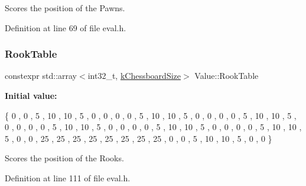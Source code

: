 Scores the position of the Pawns. 



Definition at line 69 of file eval.\+h.

\mbox{\label{namespaceValue_ae8066836a21ce4367ff232f08ce796a8}} 
\subsubsection{\texorpdfstring{Rook\+Table}{RookTable}}
{\footnotesize\ttfamily constexpr std\+::array$<$int32\+\_\+t, \mbox{\hyperlink{constants_8h_a901d7bb0bf36a71e09079f9dd4168c4c}{k\+Chessboard\+Size}}$>$ Value\+::\+Rook\+Table}

{\bfseries Initial value\+:}
\begin{DoxyCode}
\{
        0   ,   0   ,   5   ,   10  ,   10  ,   5   ,   0   ,   0   ,
        0   ,   0   ,   5   ,   10  ,   10  ,   5   ,   0   ,   0   ,
        0   ,   0   ,   5   ,   10  ,   10  ,   5   ,   0   ,   0   ,
        0   ,   0   ,   5   ,   10  ,   10  ,   5   ,   0   ,   0   ,
        0   ,   0   ,   5   ,   10  ,   10  ,   5   ,   0   ,   0   ,
        0   ,   0   ,   5   ,   10  ,   10  ,   5   ,   0   ,   0   ,
        25  ,   25  ,   25  ,   25  ,   25  ,   25  ,   25  ,   25  ,
        0   ,   0   ,   5   ,   10  ,   10  ,   5   ,   0   ,   0       
    \}
\end{DoxyCode}


Scores the position of the Rooks. 



Definition at line 111 of file eval.\+h.

